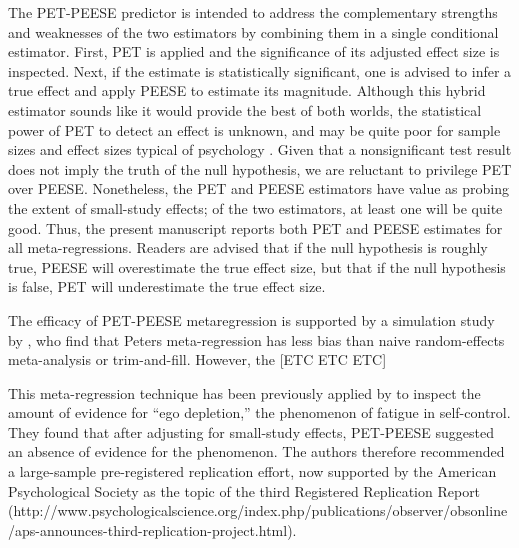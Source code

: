 \documentclass[man]{apa6}
\begin{document}
The PET-PEESE predictor is intended to address the complementary strengths and weaknesses of the two estimators by combining them in a single conditional estimator. First, PET is applied and the significance of its adjusted effect size is inspected. Next, if the estimate is statistically significant, one is advised to infer a true effect and apply PEESE to estimate its magnitude. Although this hybrid estimator sounds like it would provide the best of both worlds, the statistical power of PET to detect an effect is unknown, and may be quite poor for sample sizes and effect sizes typical of psychology \citet{blogposts}. Given that a nonsignificant test result does not imply the truth of the null hypothesis, we are reluctant to privilege PET over PEESE. Nonetheless, the PET and PEESE estimators have value as probing the extent of small-study effects; of the two estimators, at least one will be quite good. Thus, the present manuscript reports both PET and PEESE estimates for all meta-regressions. Readers are advised that if the null hypothesis is roughly true, PEESE will overestimate the true effect size, but that if the null hypothesis is false, PET will underestimate the true effect size.

The efficacy of PET-PEESE metaregression is supported by a simulation study by \citet{Moreno:etal:2006}, who find that Peters meta-regression has less bias than naive random-effects meta-analysis or trim-and-fill. However, the [ETC ETC ETC]

This meta-regression technique has been previously applied by \citet{Carter:McCullough:2014} to inspect the amount of evidence for ``ego depletion,'' the phenomenon of fatigue in self-control. They found that after adjusting for small-study effects, PET-PEESE suggested an absence of evidence for the phenomenon. The authors therefore recommended a large-sample pre-registered replication effort, now supported by the American Psychological Society as the topic of the third Registered Replication Report (http://www.psychologicalscience.org/index.php/publications/observer/obsonline/aps-announces-third-replication-project.html).
\end{document}
